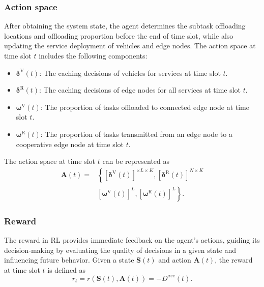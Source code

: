 \documentclass[lettersize,journal]{IEEEtran}
\begin{document}
\subsubsection{Action space}
After obtaining the system state, the agent determines the subtask offloading locations and offloading proportion before the end of time slot, while also updating the  service deployment of vehicles and edge nodes. The action space  at time slot $ t $ includes the following components:
\begin{itemize}
	\item $ \boldsymbol{\delta}^{\text{V}}(t) $: The caching decisions of vehicles for  services at time slot $ t $.
	\item $ \boldsymbol{\delta}^{\text{R}}(t)$: The caching decisions of edge nodes for all services at time slot $ t $.
	\item $\boldsymbol{\omega}^{\text{V}}(t) $: The proportion of  tasks offloaded to  connected edge node at time slot $ t $.
	\item $\boldsymbol{\omega}^{\text{R}}(t)$: The proportion of  tasks transmitted from an edge node to a cooperative edge node at time slot $ t $.
\end{itemize}
The action space at time slot $ t $ can be represented as
\begin{equation}
	\label{equ: action space}
	\begin{aligned}
		\mathbf{A}(t) = & \left\{  [\boldsymbol{\delta}^{\text{V}}(t)]^{\times L \times K},   [\boldsymbol{\delta}^{\text{R}}(t)]^{N \times K} \right. \\
						& \left. [ \boldsymbol{\omega}^{\text{V}}(t)]^{ L},  [ \boldsymbol{\omega}^{\text{R}}(t)]^{L}         \right\}.
	\end{aligned}
\end{equation}
\subsubsection{Reward}
The reward in RL provides immediate feedback on the agent's actions, guiding its decision-making by evaluating the quality of decisions in a given state and influencing future behavior.
Given a state $ \mathbf{S}(t) $ and action $ \mathbf{A}(t) $, the reward at time slot $ t $ is defined as  
\begin{equation}
	\label{equ: reward}
	r_t = r(\mathbf{S}(t),\mathbf{A}(t)) = -D^{ave}(t).
\end{equation}
\end{document}

